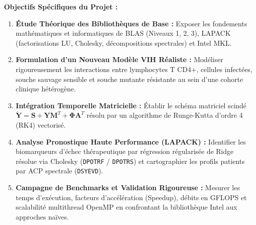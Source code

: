 \documentclass[11pt,a4paper]{report}
\theoremstyle{plain}
\theoremstyle{definition}
\theoremstyle{remark}
\begin{document}
\vspace{0.3cm}
\noindent\textbf{Objectifs Spécifiques du Projet :}
\begin{enumerate}
    \item \textbf{Étude Théorique des Bibliothèques de Base :} Exposer les fondements mathématiques et informatiques de BLAS (Niveaux 1, 2, 3), LAPACK (factorisations LU, Cholesky, décompositions spectrales) et Intel MKL.
    \item \textbf{Formulation d'un Nouveau Modèle VIH Réaliste :} Modéliser rigoureusement les interactions entre lymphocytes T CD4+, cellules infectées, souche sauvage sensible et souche mutante résistante au sein d'une cohorte clinique hétérogène.
    \item \textbf{Intégration Temporelle Matricielle :} Établir le schéma matriciel scindé $\dot{\mathbf{Y}} = \mathbf{S} + \mathbf{Y}\mathbf{M}^T + \mathbf{\Phi}\mathbf{A}^T$ résolu par un algorithme de Runge-Kutta d'ordre 4 (RK4) vectorisé.
    \item \textbf{Analyse Pronostique Haute Performance (LAPACK) :} Identifier les biomarqueurs d'échec thérapeutique par régression régularisée de Ridge résolue via Cholesky (\texttt{DPOTRF} / \texttt{DPOTRS}) et cartographier les profils patients par ACP spectrale (\texttt{DSYEVD}).
    \item \textbf{Campagne de Benchmarks et Validation Rigoureuse :} Mesurer les temps d'exécution, facteurs d'accélération (Speedup), débits en GFLOPS et scalabilité multithread OpenMP en confrontant la bibliothèque Intel aux approches naïves.
\end{enumerate}
\end{document}
